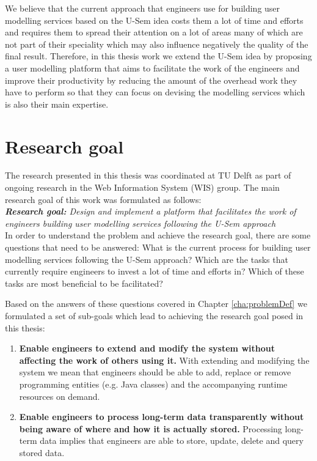 We believe that the current approach that engineers use for building user modelling services based on the U-Sem idea costs them a lot of time and efforts and requires them to spread their attention on a lot of areas many of which are not part of their speciality which may also influence negatively the quality of the final result. Therefore, in this thesis work we extend the U-Sem idea by proposing a user modelling platform that aims to facilitate the work of the engineers and improve their productivity by reducing the amount of the overhead work they have to perform so that they can focus on devising the modelling services which is also their main expertise.


\section{Research goal}

The research presented in this thesis was coordinated at TU Delft as part of ongoing research in the Web Information System (WIS) group. The main research goal of this work was formulated as follows:\\

\textit{\textbf{Research goal:} Design and implement a platform that facilitates the work of engineers building user modelling services following the U-Sem approach}\\

In order to understand the problem and achieve the research goal, there are some questions that need to be answered: What is the current process for building user modelling services following the U-Sem approach? Which are the tasks that currently require engineers to invest a lot of time and efforts in? Which of these tasks are most beneficial to be facilitated? 

Based on the answers of these questions covered in Chapter \ref{cha:problemDef} we formulated a set of sub-goals which lead to achieving the research goal posed in this thesis:

\begin{enumerate}
\item \textbf{Enable engineers to extend and modify the system without affecting the work of others using it.}
With extending and modifying the system we mean that engineers should be able to add, replace or remove programming entities (e.g. Java classes) and the accompanying runtime resources on demand.

\item \textbf{Enable engineers to process long-term data transparently without being aware of where and how it is actually stored.}
Processing long-term data implies that engineers are able to store, update, delete and query stored data.

\end{enumerate}

